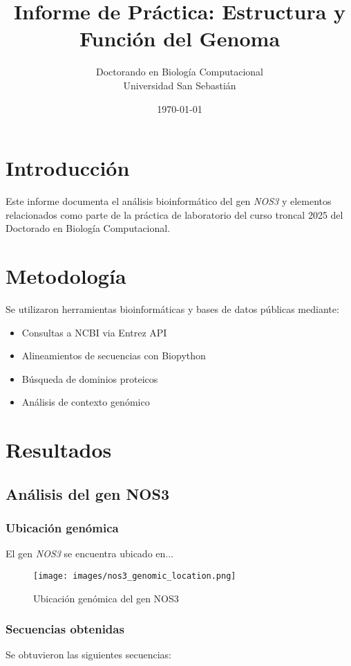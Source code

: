 \documentclass[12pt, a4paper]{article}
\title{Informe de Práctica: Estructura y Función del Genoma}
\author{Doctorando en Biología Computacional \\ Universidad San Sebastián}
\date{\today}
\begin{document}
\maketitle

\section{Introducción}
Este informe documenta el análisis bioinformático del gen \textit{NOS3} y elementos relacionados como parte de la práctica de laboratorio del curso troncal 2025 del Doctorado en Biología Computacional.

\section{Metodología}
Se utilizaron herramientas bioinformáticas y bases de datos públicas mediante:

\begin{itemize}
\item Consultas a NCBI via Entrez API
\item Alineamientos de secuencias con Biopython
\item Búsqueda de dominios proteicos
\item Análisis de contexto genómico
\end{itemize}

\section{Resultados}

\subsection{Análisis del gen NOS3}

\subsubsection{Ubicación genómica}
El gen \textit{NOS3} se encuentra ubicado en...

\begin{figure}[H]
\centering
\texttt{[image: images/nos3\_genomic\_location.png]}
\caption{Ubicación genómica del gen NOS3}
\label{fig:nos3_loc}
\end{figure}

\subsubsection{Secuencias obtenidas}
Se obtuvieron las siguientes secuencias:
\end{document}

